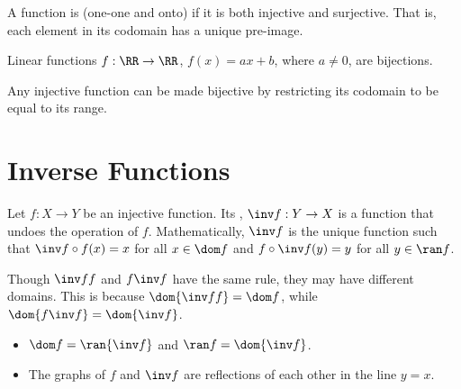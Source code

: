 \begin{definition}
    A function is  (one-one and onto) if it is both injective and surjective. That is, each element in its codomain has a unique pre-image.
\end{definition}

\begin{example}
    Linear functions $f : \RR \to \RR$, $f(x) = ax + b$, where $a \neq 0$, are bijections.
\end{example}

Any injective function can be made bijective by restricting its codomain to be equal to its range.

\section{Inverse Functions}

\begin{definition}
    Let $f : X \to Y$ be an injective function. Its , $\inv f : Y \to X$ is a function that undoes the operation of $f$. Mathematically, $\inv f$ is the unique function such that $\inv f \circ f(x) = x$ for all $x \in \dom f$ and $f \circ \inv f(y) = y$ for all $y \in \ran f$.
\end{definition}

Though $\inv f f$ and $f \inv f$ have the same rule, they may have different domains. This is because $\dom {\inv f f} = \dom f$, while $\dom {f \inv f} = \dom {\inv f}$.

\begin{fact}
    \phantom{.}
    \begin{itemize}
        \item $\dom f = \ran{\inv f}$ and $\ran f = \dom{\inv f}$.
        \item The graphs of $f$ and $\inv f$ are reflections of each other in the line $y = x$.
    \end{itemize}
\end{fact}

